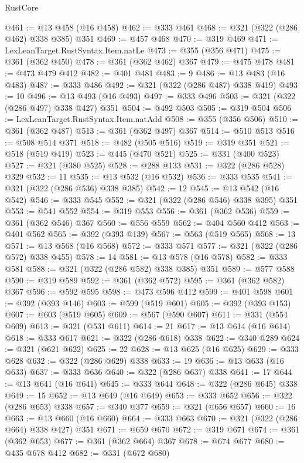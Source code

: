 \begin{lexlean}{RustCore}
\begin{coremodule}
@461 := @13 @458 (@16 @458)
@462 := @333 @461
@468 := @321 (@322 (@286 @462) @338 @385) @351
@469 := @457 @468
@470 := @319 @469
@471 := LexLeanTarget.RustSyntax.Item.natLe
@473 := @355 (@356 @471)
@475 := @361 (@362 @450)
@478 := @361 (@362 @462) @367
@479 := @475 @478
@481 := @473 @479 @412
@482 := @401 @481
@483 := 9
@486 := @13 @483 (@16 @483)
@487 := @333 @486
@492 := @321 (@322 (@286 @487) @338 @419)
@493 := 10
@496 := @13 @493 (@16 @493)
@497 := @333 @496
@503 := @321 (@322 (@286 @497) @338 @427) @351
@504 := @492 @503
@505 := @319 @504
@506 := LexLeanTarget.RustSyntax.Item.natAdd
@508 := @355 (@356 @506)
@510 := @361 (@362 @487)
@513 := @361 (@362 @497) @367
@514 := @510 @513
@516 := @508 @514 @371
@518 := @482 (@505 @516)
@519 := @319 @351
@521 := @518 (@519 @419)
@523 := @445 (@470 @521)
@525 := @331 (@400 @523)
@527 := @321 (@380 @525)
@528 := @288 @133
@531 := @322 (@286 @528) @329
@532 := 11
@535 := @13 @532 (@16 @532)
@536 := @333 @535
@541 := @321 (@322 (@286 @536) @338 @385)
@542 := 12
@545 := @13 @542 (@16 @542)
@546 := @333 @545
@552 := @321 (@322 (@286 @546) @338 @395) @351
@553 := @541 @552
@554 := @319 @553
@556 := @361 (@362 @536)
@559 := @361 (@362 @546) @367
@560 := @556 @559
@562 := @404 @560 @412
@563 := @401 @562
@565 := @392 (@393 @139)
@567 := @563 (@519 @565)
@568 := 13
@571 := @13 @568 (@16 @568)
@572 := @333 @571
@577 := @321 (@322 (@286 @572) @338 @455)
@578 := 14
@581 := @13 @578 (@16 @578)
@582 := @333 @581
@588 := @321 (@322 (@286 @582) @338 @385) @351
@589 := @577 @588
@590 := @319 @589
@592 := @361 (@362 @572)
@595 := @361 (@362 @582) @367
@596 := @592 @595
@598 := @473 @596 @412
@599 := @401 @598
@601 := @392 (@393 @146)
@603 := @599 (@519 @601)
@605 := @392 (@393 @153)
@607 := @603 (@519 @605)
@609 := @567 (@590 @607)
@611 := @331 (@554 @609)
@613 := @321 (@531 @611)
@614 := 21
@617 := @13 @614 (@16 @614)
@618 := @333 @617
@621 := @322 (@286 @618) @338
@622 := @340 @289
@624 := @321 (@621 @622)
@625 := 22
@628 := @13 @625 (@16 @625)
@629 := @333 @628
@632 := @322 (@286 @629) @338
@633 := 19
@636 := @13 @633 (@16 @633)
@637 := @333 @636
@640 := @322 (@286 @637) @338
@641 := 17
@644 := @13 @641 (@16 @641)
@645 := @333 @644
@648 := @322 (@286 @645) @338
@649 := 15
@652 := @13 @649 (@16 @649)
@653 := @333 @652
@656 := @322 (@286 @653) @338
@657 := @340 @377
@659 := @321 (@656 @657)
@660 := 16
@663 := @13 @660 (@16 @660)
@664 := @333 @663
@670 := @321 (@322 (@286 @664) @338 @427) @351
@671 := @659 @670
@672 := @319 @671
@674 := @361 (@362 @653)
@677 := @361 (@362 @664) @367
@678 := @674 @677
@680 := @435 @678 @412
@682 := @331 (@672 @680)

\end{coremodule}
\end{lexlean}
